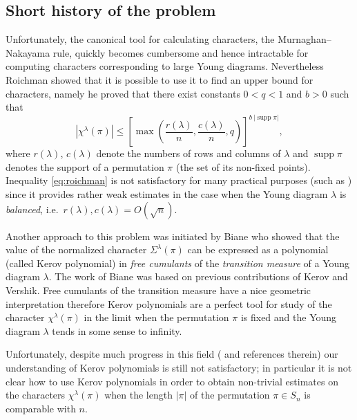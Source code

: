 \documentclass[12pt]{amsart}
\theoremstyle{plain}
\theoremstyle{remark}
\DeclareMathOperator{\supp}{supp}
\begin{document}
\subsection{Short history of the problem}
Unfortunately, the canonical tool for calculating characters, 
the Murnaghan--Nakayama rule, quickly becomes cumbersome and hence intractable 
for computing characters corresponding to large Young diagrams. Nevertheless 
Roichman \cite{Roichman1996} showed that it is possible to use it to find an upper bound for
characters, namely he proved that there exist constants $0<q<1$ and $b>0$ such
that
\begin{equation}
\label{eq:roichman}
 |\chi^{\lambda}(\pi) | \leq 
\left[\max\left(\frac{r(\lambda)}{n},\frac{c(\lambda)}{n},q\right) \right]^{b\ |\supp \pi|},
\end{equation}
where 
$r(\lambda)$, $c(\lambda)$ denote the numbers of rows and columns of $\lambda$ and
$\supp \pi$ denotes the support of a permutation $\pi$ (the set of its non-fixed points).
Inequality \eqref{eq:roichman} is not satisfactory for many practical purposes (such as 
\cite{MooreRussellSniady}) since it provides rather weak estimates in the case
when the Young diagram $\lambda$ is \emph{balanced}, i.e.\
$r(\lambda),c(\lambda)=O(\sqrt{n})$.



Another approach to this problem was initiated by Biane \cite{Biane1998,Biane2003} who 
showed that the value of the normalized character $\Sigma^{\lambda}(\pi)$ 
can be expressed as a polynomial (called Kerov polynomial) in
\emph{free cumulants} of
the \emph{transition measure} of a Young diagram $\lambda$. The work of Biane
was based on previous
contributions of Kerov \cite{Kerov1993,Kerov1999} and Vershik. Free cumulants of the transition
measure have a nice geometric interpretation therefore Kerov polynomials are a perfect tool 
for study of the character $\chi^{\lambda}(\pi)$ in the limit when the permutation $\pi$ is fixed
and the Young diagram $\lambda$ tends in some sense to infinity.

Unfortunately, despite much progress in this field
(\cite{DolegaF'eray'Sniady2008} and references therein)
our understanding of Kerov polynomials is still not satisfactory; in particular it is not clear
how to use Kerov polynomials in order to obtain non-trivial estimates on the characters
$\chi^{\lambda}(\pi)$ when the length $|\pi|$ of the permutation $\pi\in S_n$ is comparable
with $n$.
\end{document}
